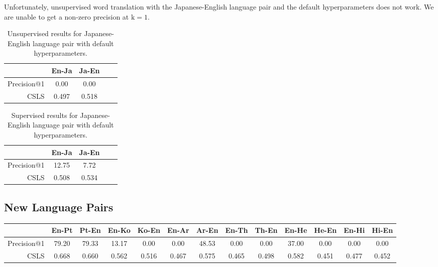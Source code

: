 \documentclass{article}
\begin{document}
Unfortunately, unsupervised word translation with the Japanese-English language
pair and the default hyperparameters does not work. We are unable to get a
non-zero precision at $\text{k}=1$.

\begin{table}[h]
  \centering
  \begin{tabular}{||r|cc|cc||}
    \hline
    & En-Ja & Ja-En \\
    \hline
    Precision@1 &  0.00 &  0.00 \\
    CSLS        & 0.497 & 0.518 \\
    \hline
  \end{tabular}
  \caption{Unsupervised results for Japanese-English language pair with default hyperparameters.}
\end{table}

\begin{table}[h]
  \centering
  \begin{tabular}{||r|cc|cc||}
    \hline
    & En-Ja & Ja-En \\
    \hline
    Precision@1 & 12.75 &  7.72 \\
    CSLS        & 0.508 & 0.534 \\
    \hline
  \end{tabular}
  \caption{Supervised results for Japanese-English language pair with default hyperparameters.}
\end{table}

\subsection*{New Language Pairs}

\begin{table}
  \tabcolsep=0.07cm
  \begin{tabular}{||r|cc|cc|cc|cc|cc|cc||}
    \hline
    & En-Pt & Pt-En & En-Ko & Ko-En & En-Ar & Ar-En & En-Th & Th-En
    & En-He & He-En & En-Hi & Hi-En \\
    \hline
    Precision@1 & 79.20 & 79.33 & 13.17 &  0.00 &  0.00 & 48.53 &  0.00 &  0.00
      & 37.00 &  0.00 &  0.00 &  0.00 \\
    CSLS        & 0.668 & 0.660 & 0.562 & 0.516 & 0.467 & 0.575 & 0.465 & 0.498
      & 0.582 & 0.451 & 0.477 & 0.452 \\
    \hline
  \end{tabular}
\end{table}
\end{document}
